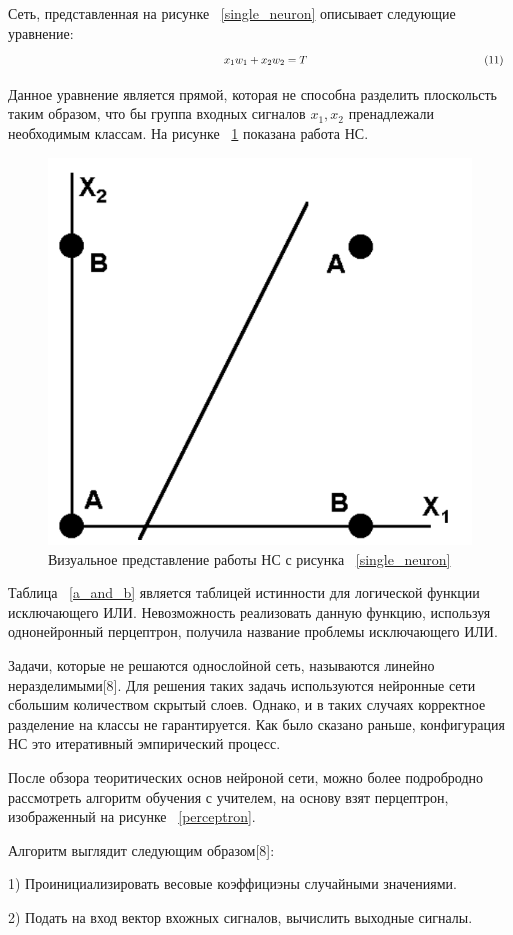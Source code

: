 \documentclass[a4paper,english,russian]{G2-105}
\begin{document}
\par Сеть, представленная на рисунке ~\ref{single_neuron} описывает следующие уравнение:
\[
\ \hspace*{66mm} x_1 w_1 + x_2 w_2=T \ \hspace*{56mm} (11)
\] 
\par Данное уравнение является прямой, которая не способна разделить плоскольсть таким образом, что бы группа входных сигналов $x_1, x_2$ пренадлежали необходимым классам. На рисунке ~\ref{line_class} показана работа НС.
\begin{figure}
    \includegraphics[width=0.6\linewidth]{line_class.png}
    \caption{Визуальное представление работы НС с рисунка ~\ref{single_neuron}}
	\label{line_class}
\end{figure}
\par Таблица ~\ref{a_and_b} является таблицей истинности для логической функции исключающего ИЛИ. Невозможность реализовать данную функцию, используя однонейронный перцептрон, получила название проблемы исключающего ИЛИ.
\par Задачи, которые не решаются однослойной сеть, называются линейно неразделимыми[8]. Для решения таких задачь используются нейронные сети сбольшим количеством скрытый слоев. Однако, и в таких случаях корректное разделение на классы не гарантируется. Как было сказано раньше, конфигурация НС это итеративный эмпирический процесс.
\par После обзора теоритических основ нейроной сети, можно более подробродно рассмотреть алгоритм обучения с учителем, на основу взят перцептрон, изображенный на рисунке ~\ref{perceptron}.
\par Алгоритм выглядит следующим образом[8]:
\par 1) Проинициализировать весовые коэффициэны случайными значениями.
\par 2) Подать на вход вектор вхожных сигналов, вычислить выходные сигналы.
\end{document}
